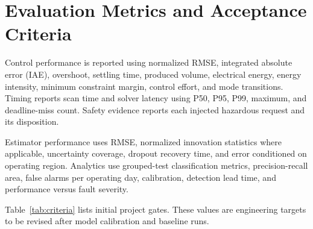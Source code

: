 \documentclass[conference]{IEEEtran}
\begin{document}
\section{Evaluation Metrics and Acceptance Criteria}
Control performance is reported using normalized RMSE, integrated absolute error (IAE), overshoot, settling time, produced volume, electrical energy, energy intensity, minimum constraint margin, control effort, and mode transitions. Timing reports scan time and solver latency using P50, P95, P99, maximum, and deadline-miss count. Safety evidence reports each injected hazardous request and its disposition.

Estimator performance uses RMSE, normalized innovation statistics where applicable, uncertainty coverage, dropout recovery time, and error conditioned on operating region. Analytics use grouped-test classification metrics, precision-recall area, false alarms per operating day, calibration, detection lead time, and performance versus fault severity.

Table~\ref{tab:criteria} lists initial project gates. These values are engineering targets to be revised after model calibration and baseline runs.
\end{document}
